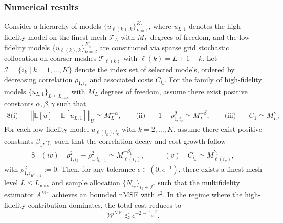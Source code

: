 \documentclass{beamer}
\begin{document}
\begin{frame}[t]
    \frametitle{Numerical results}

{\fontsize{7.8}{7.8}\selectfont 
\begin{theorem}\label{thm:Sample_cost_est}
Consider a hierarchy of models $\{u_{\ell(k),k}\}_{k=1}^{K_c}$, where $u_{L,1}$ denotes the high-fidelity model on the finest mesh $\mathcal{T}_L$ with $M_L$ degrees of freedom, and the low-fidelity models $\{u_{\ell(k),k}\}_{k=2}^{K_c}$ are constructed via sparse grid stochastic collocation on coarser meshes $\mathcal{T}_{\ell(k)}$ with $\ell(k) = L + 1 - k$. Let $\mathcal{I} = \{i_k \mid k = 1, \dots, K\}$ denote the index set of selected models, ordered by decreasing correlation $\rho_{1,i_k}$ and associated costs $C_{i_k}$. For the family of high-fidelity models $\{u_{L,1}\}_{L\le L_{\max}}$ with $M_L$ degrees of freedom, assume  there exist positive constants $\alpha, \beta, \gamma$ such that
%
\begin{alignat*}{8}
    \text{(i)}\quad & \left\Vert \mathbb{E}[u] - \mathbb{E}[u_{L,1}] \right\Vert_U \simeq M_L^{-\alpha}, \qquad
    \text{(ii)}\quad & 1 - \rho_{1,i_2}^2 \simeq M_L^{-\beta}, \qquad
    \text{(iii)}\quad & C_1 \simeq M_L^{\gamma},
\end{alignat*}
%
For each low-fidelity model $u_{\ell(i_k),i_k}$ with $k = 2, \dots, K$, assume there exist positive constants $\beta_1, \gamma_1$ such that the correlation decay and cost growth follow
%
\begin{alignat*}{8}
    &(iv)\quad \rho_{1,i_k}^2-\rho_{1,i_{k+1}}^2 \simeq M_{\ell(i_k)}^{-\beta_1},
    \qquad
&(v)\quad C_{i_k} \simeq M_{\ell(i_k)}^{\gamma_1},
\end{alignat*}
%
with $\rho_{1,i_{K^*+1}}^2 := 0$. Then, for any tolerance $\epsilon \in (0, e^{-1})$, there exists a finest mesh level $L \le L_{\max}$ and sample allocation $\{N_{i_k}\}_{i_k \in \mathcal{I}^*}$ such that the multifidelity estimator $A^{\mathrm{MF}}$ achieves an bounded nMSE  with $\epsilon^2$. In the regime where the high-fidelity contribution dominates, the total cost reduces to
%
\[
\mathcal{W}^{\mathrm{MF}} \lesssim \epsilon^{-2 - \frac{\gamma-\beta}{\alpha}}.
\]
%
\end{theorem}
}
\end{frame}
\end{document}
